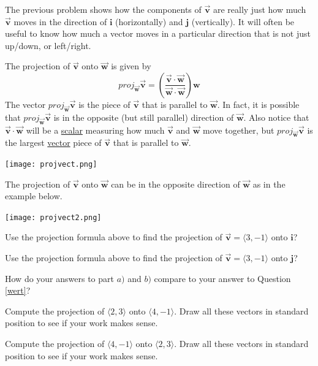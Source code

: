 \begin{info} The previous problem shows how the components of $\vec{\textbf{v}}$ are really just how much $\vec{\textbf{v}}$ moves in the direction of $\textbf{i}$ (horizontally) and $\textbf{j}$ (vertically). It will often be useful to know how much a vector moves in a particular direction that is not just up/down, or left/right.

The projection of $\vec{\textbf{v}}$ onto $\vec{\textbf{w}}$ is given by
$$proj_{\vec{\textbf{w}}} \vec{\textbf{v}}= \left( \frac{\vec{\textbf{v}} \cdot \vec{\textbf{w}}}{\vec{\textbf{w}} \cdot \vec{\textbf{w}}} \right) \textbf{w}$$
The vector $proj_{\vec{\textbf{w}}} \vec{\textbf{v}}$ is the piece of $\vec{\textbf{v}}$ that is parallel to $\vec{\textbf{w}}$. In fact, it is possible that $proj_{\vec{\textbf{w}}} \vec{\textbf{v}}$ is in the opposite (but still parallel) direction of $\vec{\textbf{w}}$. Also notice that $\vec{\textbf{v}} \cdot \vec{\textbf{w}}$ will be a \underline{scalar} measuring how much $\vec{\textbf{v}}$ and $\vec{\textbf{w}}$ move together, but $proj_{\vec{\textbf{w}}} \vec{\textbf{v}}$ is the largest \underline{vector} piece of $\vec{\textbf{v}}$ that is parallel to $\vec{\textbf{w}}$.

\begin{center} \texttt{[image: projvect.png]} \end{center}

The projection of $\vec{\textbf{v}}$ onto $\vec{\textbf{w}}$ can be in the opposite direction of $\vec{\textbf{w}}$ as in the example below.

\begin{center} \texttt{[image: projvect2.png]} \end{center}
\end{info}

\bq \be
\item Use the projection formula above to find the projection of $\vec{\textbf{v}}=\langle 3,-1\rangle$ onto $\textbf{i}$?
\item Use the projection formula above to find the projection of $\vec{\textbf{v}}=\langle 3,-1\rangle$ onto $\textbf{j}$?
\item How do your answers to part $a)$ and $b)$ compare to your answer to Question \ref{wert}?
\ee \eq

\bq Compute the projection of $\langle 2,3\rangle$ onto $\langle 4,-1\rangle$. Draw all these vectors in standard position to see if your work makes sense.
\eq

\bq Compute the projection of $\langle 4,-1\rangle$ onto $\langle 2,3\rangle$. Draw all these vectors in standard position to see if your work makes sense.
\eq

